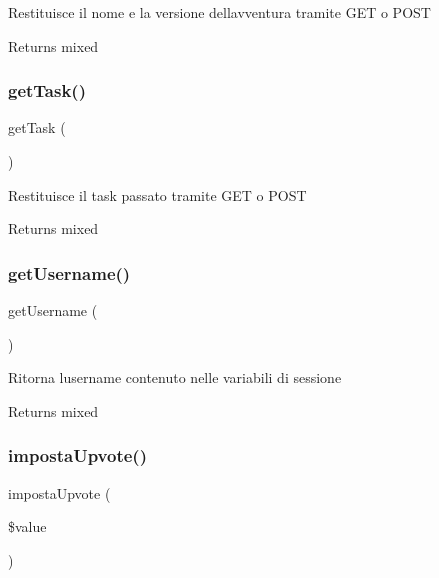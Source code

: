 Restituisce il nome e la versione dell\textquotesingle{}avventura tramite G\+ET o P\+O\+ST

\begin{DoxyReturn}{Returns}
mixed 
\end{DoxyReturn}
\mbox{\label{class_v_ricerca_a13871c4434338f02d6f8d430fa0597f2}} 
\subsubsection{\texorpdfstring{get\+Task()}{getTask()}}
{\footnotesize\ttfamily get\+Task (\begin{DoxyParamCaption}{ }\end{DoxyParamCaption})}

Restituisce il task passato tramite G\+ET o P\+O\+ST

\begin{DoxyReturn}{Returns}
mixed 
\end{DoxyReturn}
\mbox{\label{class_v_ricerca_a81b37a3c9d639574e394f80c1138c75e}} 
\subsubsection{\texorpdfstring{get\+Username()}{getUsername()}}
{\footnotesize\ttfamily get\+Username (\begin{DoxyParamCaption}{ }\end{DoxyParamCaption})}

Ritorna l\textquotesingle{}username contenuto nelle variabili di sessione

\begin{DoxyReturn}{Returns}
mixed 
\end{DoxyReturn}
\mbox{\label{class_v_ricerca_ab8847e349586a6d30c71143e8c96d14b}} 
\subsubsection{\texorpdfstring{imposta\+Upvote()}{impostaUpvote()}}
{\footnotesize\ttfamily imposta\+Upvote (\begin{DoxyParamCaption}\item[{}]{\$value }\end{DoxyParamCaption})}


